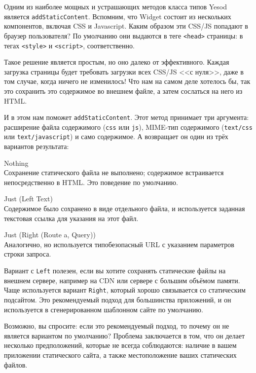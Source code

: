 Одним из наиболее мощных и устрашающих методов класса типов Yesod является \lstinline!addStaticContent!. Вспомним, что Widget состоит из нескольких компонентов, включая CSS и Javascript. Каким образом эти CSS/JS попадают в браузер пользователя? По умолчанию они выдаются в теге \lstinline!<head>! страницы: в тегах \lstinline!<style>! и \lstinline!<script>!, соответственно.

Такое решение является простым, но оно далеко от эффективного. Каждая загрузка страницы будет требовать загрузки всех CSS/JS <<с нуля>>, даже в том случае, когда ничего не изменилось! Что нам на самом деле хотелось бы, так это сохранить это содержимое во внешнем файле, а затем сослаться на него из HTML.

И в этом нам поможет \lstinline!addStaticContent!. Этот метод принимает три аргумента: расширение файла содержимого (\lstinline!css! или \lstinline!js!), MIME-тип содержимого (\lstinline!text/css! или \lstinline!text/javascript!) и само содержимое. А возвращает он один из трёх вариантов результата:

\begin{description}
  \item {Nothing}  \hfill \\
    Сохранение статического файла не выполнено; содержимое встраивается непосредственно в HTML. Это поведение по умолчанию.
  \item {Just (Left Text)} \hfill \\
    Содержимое было сохранено в виде отдельного файла, и используется заданная текстовая ссылка для указания на этот файл.
  \item {Just (Right (Route a, Query))} \hfill \\
    Аналогично, но используется типобезопасный URL с указанием параметров строки запроса.
\end{description}

Вариант с \lstinline!Left! полезен, если вы хотите сохранять статические файлы на внешнем сервере, например на CDN или сервере с большим объёмом памяти. Чаще используется вариант \lstinline!Right!, который хорошо связывается со статическим подсайтом. Это рекомендуемый подход для большинства приложений, и он используется в сгенерированном шаблонном сайте по умолчанию.

\begin{remark}
Возможно, вы спросите: если это рекомендуемый подход, то почему он не является вариантом по умолчанию? Проблема заключается в том, что он делает несколько предположений, которые не всегда соблюдаются: наличие в вашем приложении статического сайта, а также местоположение ваших статических файлов.
\end{remark}

